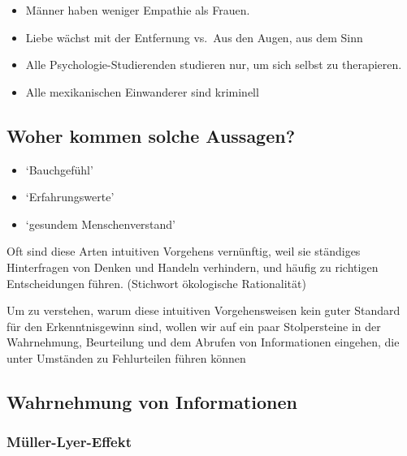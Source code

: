 \documentclass[
]{book}
\providecommand{\tightlist}{%
  \setlength{\itemsep}{0pt}\setlength{\parskip}{0pt}}
\begin{document}
\begin{itemize}
\tightlist
\item
  Männer haben weniger Empathie als Frauen.\smallskip
\item
  Liebe wächst mit der Entfernung vs.~Aus den Augen, aus dem Sinn \smallskip
\item
  Alle Psychologie-Studierenden studieren nur, um sich selbst zu therapieren. \smallskip
\item
  Alle mexikanischen Einwanderer sind kriminell
\end{itemize}

\hypertarget{woher-kommen-solche-aussagen}{%
\subsection{Woher kommen solche Aussagen?}\label{woher-kommen-solche-aussagen}}

\begin{itemize}
\tightlist
\item
  `Bauchgefühl' \smallskip
\item
  `Erfahrungswerte' \smallskip
\item
  `gesundem Menschenverstand'
\end{itemize}

Oft sind diese Arten intuitiven Vorgehens vernünftig, weil sie ständiges Hinterfragen von Denken und Handeln verhindern, und häufig zu richtigen Entscheidungen führen. (Stichwort ökologische Rationalität)\medskip

Um zu verstehen, warum diese intuitiven Vorgehensweisen kein guter Standard für den Erkenntnisgewinn sind, wollen wir auf ein paar Stolpersteine in der Wahrnehmung, Beurteilung und dem Abrufen von Informationen eingehen, die unter Umständen zu Fehlurteilen führen können

\hypertarget{wahrnehmung-von-informationen}{%
\subsection{Wahrnehmung von Informationen}\label{wahrnehmung-von-informationen}}

\hypertarget{muxfcller-lyer-effekt}{%
\subsubsection{Müller-Lyer-Effekt}\label{muxfcller-lyer-effekt}}
\end{document}
